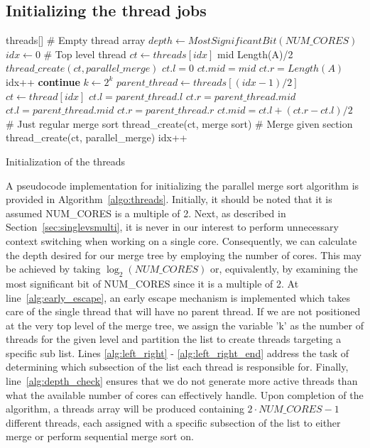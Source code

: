 \subsection{Initializing the thread jobs}\label{sec:init_threads}
\begin{algorithm}
  \begin{algorithmic}[1]
    \Require threads[] \# Empty thread array
    \State $depth \leftarrow MostSignificantBit(NUM\_CORES)$
    \State $idx \leftarrow 0$
     \label{alg:early_escape}
    \State \# Top level thread
    \State $ct \leftarrow threads[idx]$
    \State mid \leftarrow Length(A)/2
    \State $thread\_create(ct, parallel\_merge)$
    \State $ct.l = 0$
    \State $ct.mid = mid$
    \State $ct.r = Length(A)$
    \State idx++
    \State \textbf{continue}
    \EndIf
    \State $k \leftarrow 2^k$
    \State $parent\_thread \leftarrow threads[(idx - 1)/2]$
    \State $ct \leftarrow thread[idx]$
     \label{alg:left_right}
    \State $ct.l = parent\_thread.l$
    \State $ct.r = parent\_thread.mid$
    \Else
    \State $ct.l = parent\_thread.mid$
    \State $ct.r = parent\_thread.r$
    \EndIf
    \State $ct.mid = ct.l + (ct.r - ct.l)/2$ \label{alg:left_right_end}
     \label{alg:depth_check}
    \State \# Just regular merge sort
    \State thread\_create(ct, merge sort)
    \Else
    \State \# Merge given section
    \State thread\_create(ct, parallel\_merge)
    \EndIf
    \State idx++
    \EndFor
    \EndFor
  \EndProcedure
  \end{algorithmic}
  \caption{Initialization of the threads}\label{algo:threads}
\end{algorithm}
A pseudocode implementation for initializing the parallel merge sort algorithm is
provided in Algorithm~\ref{algo:threads}. Initially, it should be noted that it
is assumed NUM\_CORES is a multiple of 2. Next, as described in
Section~\ref{sec:singlevsmulti}, it is never in our interest to perform
unnecessary context switching when working on a single core. Consequently, we
can calculate the depth desired for our merge tree by employing the number of
cores. This may be achieved by taking $\log_2(NUM\_CORES)$ or, equivalently, by
examining the most significant bit of NUM\_CORES since it is a multiple of 2. At
line~\ref{alg:early_escape}, an early escape mechanism is implemented which
takes care of the single thread that will have no parent thread. If we are not
positioned at the very top level of the merge tree, we assign the variable 'k' as
the number of threads for the given level and partition the list to create
threads targeting a specific sub list. Lines \ref{alg:left_right} -
\ref{alg:left_right_end} address the task of determining which subsection of the
list each thread is responsible for. Finally, line~\ref{alg:depth_check} ensures
that we do not generate more active threads than what the available number of
cores can effectively handle. Upon completion of the algorithm, a threads array
will be produced containing $2 \cdot NUM\_CORES - 1$ different threads, each
assigned with a specific subsection of the list to either merge or perform
sequential merge sort on.

